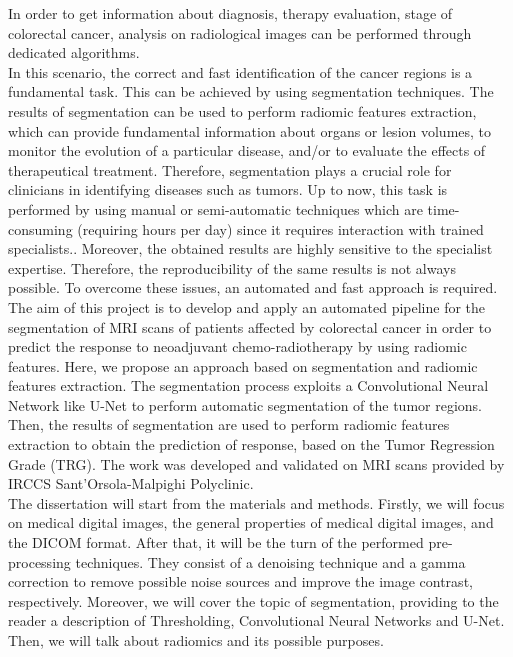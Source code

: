 \documentclass{standalone}
\begin{document}
In order to get information about diagnosis, therapy evaluation, stage of colorectal cancer, analysis on radiological images can be performed through dedicated algorithms.
\\
In this scenario, the correct and fast identification of the cancer regions is a fundamental task.
This can be achieved by using segmentation techniques.
The results of segmentation can be used to perform radiomic features extraction, which can provide fundamental information about organs or lesion volumes, to monitor the evolution of a particular disease, and/or to evaluate the effects of therapeutical treatment.
Therefore, segmentation plays a crucial role for clinicians in identifying diseases such as tumors.
Up to now, this task is performed by using manual or semi-automatic techniques which are time-consuming (requiring hours per day) since it requires interaction with trained specialists.\cite{tesicoppola, jovana}.
Moreover, the obtained results are highly sensitive to the specialist expertise.
Therefore, the reproducibility of the same results is not always possible\cite{Trebeschi2017}.
To overcome these issues, an automated and fast approach is required.
\\
The aim of this project is to develop and apply an automated pipeline for the segmentation of MRI scans of patients affected by colorectal cancer in order to predict the response to neoadjuvant chemo-radiotherapy by using radiomic features. 
Here, we propose an approach based on segmentation and radiomic features extraction.
The segmentation process exploits a Convolutional Neural Network like U-Net to perform automatic segmentation of the tumor regions.
Then, the results of segmentation are used to perform radiomic features extraction to obtain the prediction of response, based on the Tumor Regression Grade (TRG).
The work was developed and validated on MRI scans provided by IRCCS Sant’Orsola-Malpighi Polyclinic.
\\
The dissertation will start from the materials and methods.
Firstly, we will focus on medical digital images, the general properties of medical digital images, and the DICOM format.
After that, it will be the turn of the performed pre-processing techniques.
They consist of a denoising technique and a gamma correction to remove possible noise sources and improve the image contrast, respectively.
Moreover, we will cover the topic of segmentation, providing to the reader a description of Thresholding, Convolutional Neural Networks and U-Net.
Then, we will talk about radiomics and its possible purposes.
\end{document}
